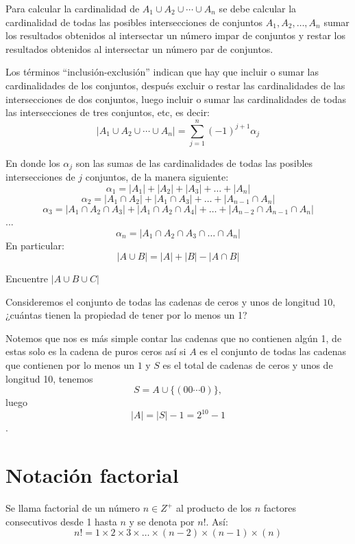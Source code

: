 \begin{definicion}
Para calcular la cardinalidad de $A_1\cup A_2\cup\cdots\cup A_n$ se debe calcular la cardinalidad de todas las posibles intersecciones de conjuntos $A_1, A_2,\dots, A_n$ sumar los resultados obtenidos al intersectar un número impar de conjuntos y restar los resultados obtenidos al intersectar un número par de conjuntos.
\end{definicion}

Los términos “inclusión-exclusión” indican que hay que incluir o sumar las cardinalidades de los conjuntos, después excluir o restar las cardinalidades de las intersecciones de dos conjuntos, luego incluir o sumar las cardinalidades de todas las intersecciones de tres conjuntos, etc, es decir:
\[|A_1\cup A_2\cup\cdots\cup A_n|=\sum_{j=1}^{n}(-1)^{j+1}\alpha_j\]

En donde los $\alpha_j$ son las sumas de las cardinalidades de todas las posibles intersecciones de $j$ conjuntos, de la manera siguiente:
\[\alpha_1= |A_1|+|A_2|+|A_3|+\dots+|A_n|\]\[\alpha_2=|A_1\cap A_2|+|A_1\cap A_3|+\dots+|A_{n-1}\cap A_n|\]\[\alpha_3=|A_1\cap A_2\cap A_3|+|A_1\cap A_2\cap A_4|+\dots+|A_{n-2}\cap A_{n-1}\cap A_n|\]...\[\alpha_n=|A_1\cap A_2\cap A_3\cap\dots \cap A_n|\]
En particular:\[|A\cup B| = |A| + |B| - |A\cap B|\]

\begin{problema}
Encuentre $|A\cup B \cup C|$
\end{problema}

\begin{ejemplo}
    Consideremos el conjunto de todas las cadenas de ceros y unos de longitud $10$, ¿cuántas tienen la propiedad de tener por lo menos un 1?
\end{ejemplo}

\begin{solucion}
    Notemos que nos es más simple contar las cadenas que no contienen algún 1, de estas solo es la cadena de puros ceros así si $A$ es el conjunto de todas las cadenas que contienen por lo menos un $1$ y $S$ es el total de cadenas de ceros y unos de longitud 10, tenemos $$S=A\cup \{(00\cdots 0)\},$$ luego $$|A|=|S|-1=2^{10}-1$$.
\end{solucion}


\section{Notación factorial}

Se llama factorial de un número $n\in Z^+$ al producto de los $n$ factores consecutivos desde 1 hasta $n$ y se denota por $n!$. Así:
\[n!=1\times2\times3\times\dots\times(n-2)\times(n-1)\times(n)\]

